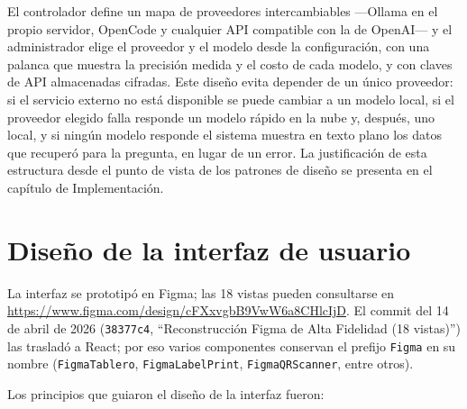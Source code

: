 El controlador define un mapa de proveedores intercambiables ---Ollama en el propio servidor, OpenCode y cualquier API compatible con la de OpenAI--- y el administrador elige el proveedor y el modelo desde la configuración, con una palanca que muestra la precisión medida y el costo de cada modelo, y con claves de API almacenadas cifradas. Este diseño evita depender de un único proveedor: si el servicio externo no está disponible se puede cambiar a un modelo local, si el proveedor elegido falla responde un modelo rápido en la nube y, después, uno local, y si ningún modelo responde el sistema muestra en texto plano los datos que recuperó para la pregunta, en lugar de un error. La justificación de esta estructura desde el punto de vista de los patrones de diseño se presenta en el capítulo de Implementación.

\section{Diseño de la interfaz de usuario}
\label{sec:dis_ui}

La interfaz se prototipó en Figma; las 18 vistas pueden consultarse en \url{https://www.figma.com/design/cFXxvgbB9VwW6a8CHlcIjD}. El commit del 14 de abril de 2026 (\texttt{38377c4}, ``Reconstrucción Figma de Alta Fidelidad (18 vistas)'') las trasladó a React; por eso varios componentes conservan el prefijo \texttt{Figma} en su nombre (\texttt{FigmaTablero}, \texttt{FigmaLabelPrint}, \texttt{FigmaQRScanner}, entre otros).

Los principios que guiaron el diseño de la interfaz fueron:

